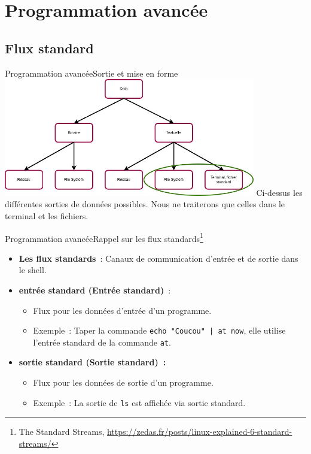 \documentclass{beamer}
\begin{document}
    \section{Programmation avancée}\label{sec:advanced-programming}

    \subsection{Flux standard}\label{subsec:standard-flux}

    \begin{frame}{Programmation avancée}{Sortie et mise en forme}
        \centering
        \includegraphics[width=11cm]{image/outputs}
        \bigbreak
        Ci-dessus les différentes sorties de données possibles.
        Nous ne traiterons que celles dans le terminal et les fichiers.
    \end{frame}

    \begin{frame}{Programmation avancée}{Rappel sur les flux standards\footnote{\label{standard-stream}The Standard Streams, \url{https://zedas.fr/posts/linux-explained-6-standard-streams/}}}
        \begin{itemize}
            \item \textbf{Les flux standards}~: Canaux de communication d'entrée et de sortie dans le shell.
            \item \textbf{entrée standard (Entrée standard)}~:
            \begin{itemize}
                \item Flux pour les données d'entrée d'un programme.
                \item Exemple~: Taper la commande \lstinline{echo "Coucou" | at now}, elle utilise l'entrée standard de la commande \lstinline{at}.
            \end{itemize}
            \item \textbf{sortie standard (Sortie standard)~:}
            \begin{itemize}
                \item Flux pour les données de sortie d'un programme.
                \item Exemple~: La sortie de \lstinline{ls} est affichée via sortie standard.
            \end{itemize}
        \end{itemize}
    \end{frame}
\end{document}
